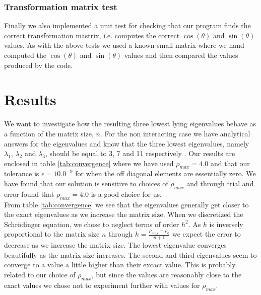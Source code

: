 \documentclass[12pt]{article}
\numberwithin{figure}{section}
\numberwithin{table}{section}
\begin{document}
\subsubsection{Transformation matrix test}
Finally we also implemented a unit test for checking that our program finds the correct transformation mastrix, i.e. computes the correct $\cos(\theta)$ and $\sin(\theta)$ values. As with the above tests we used a known small matrix where we hand computed the $\cos(\theta)$ and $\sin(\theta)$ values and then compared the values produced by the code.




\section{Results}


\noindent We want to investigate how the resulting three lowest lying eigenvalues behave as a function of the matrix size, $n$. For the non interacting case we have analytical answers for the eigenvalues and know that the three lowest eigenvalues, namely $\lambda_1$, $\lambda_2$ and $\lambda_3$, should be equal to 3, 7 and 11 respectively \cite{pro2}. Our results are enclosed in table \ref{tab:convergence} where we have used $\rho_{max} = 4.0$ and that our tolerance is $\epsilon = 10.0^{-9}$ for when the off diagonal elements are essentially zero. We have found that our solution is sensitive to choices of $\rho_{max}$ and through trial and error found that $\rho_{max} = 4.0$ is a good choice for us. \\

\noindent From table \ref{tab:convergence} we see that the eigenvalues generally get closer to the exact eigenvalues as we increase the matrix size. When we discretized the Schrödinger equation, we chose to neglect terms of order $h^2$. As $h$ is inversely proportional to the matrix size $n$ through $h = \frac{\rho_{max}-\rho_0}{n+1}$ we expect the error to decrease as we increase the matrix size. The lowest eigenvalue converges beautifully as the matrix size increases. The second and third eigenvalues seem to converge to a value a little higher than their excact value. This is probably related to our choice of $\rho_{max}$, but since the values are reasonably close to the exact values we chose not to experiment further with values for $\rho_{max}$.   \\ 
\end{document}
